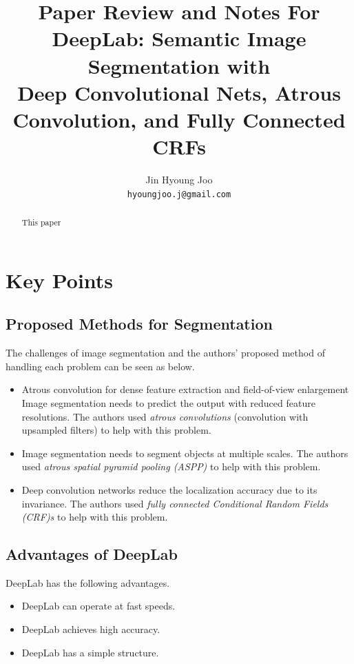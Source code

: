 \documentclass[10pt,twocolumn,letterpaper]{article}
\begin{document}
\title{Paper Review and Notes For\\DeepLab: Semantic Image Segmentation with\\Deep Convolutional Nets, Atrous Convolution, and Fully Connected CRFs}

\author{Jin Hyoung Joo\\ {\tt\small hyoungjoo.j@gmail.com} }
\maketitle

\begin{abstract}
    This paper \cite{DeepLab}
\end{abstract}

\section{Key Points}
\subsection{Proposed Methods for Segmentation}
The challenges of image segmentation and the authors' proposed method of handling
each problem can be seen as below.

\begin{itemize}
    \item{
        Atrous convolution for dense feature extraction and field-of-view enlargement
        Image segmentation needs to predict the output with reduced feature resolutions.
        The authors used \emph{atrous convolutions} (convolution with upsampled filters)
        to help with this problem.
    }
    \item{
        Image segmentation needs to segment objects at multiple scales. The authors used
        \emph{atrous spatial pyramid pooling (ASPP)} to help with this problem.
    }
    \item{
        Deep convolution networks reduce the localization accuracy due to its invariance.
        The authors used \emph{fully connected Conditional Random Fields (CRF)s} to help
        with this problem.
    }
\end{itemize}

\subsection{Advantages of DeepLab}
DeepLab has the following advantages.
\begin{itemize}
    \item{DeepLab can operate at fast speeds.}
    \item{DeepLab achieves high accuracy.}
    \item{DeepLab has a simple structure.}
\end{itemize}
\end{document}
